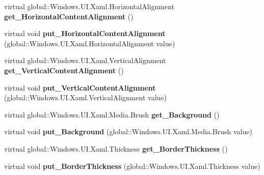 \begin{DoxyCompactItemize}
virtual global\+::\+Windows.\+U\+I.\+Xaml.\+Horizontal\+Alignment {\bfseries get\+\_\+\+Horizontal\+Content\+Alignment} ()
\item 
\mbox{\label{class_windows_1_1_u_i_1_1_xaml_1_1_controls_1_1_control_a529faaf72afad384ebe1f02f4b794a09}} 
virtual void {\bfseries put\+\_\+\+Horizontal\+Content\+Alignment} (global\+::\+Windows.\+U\+I.\+Xaml.\+Horizontal\+Alignment value)
\item 
\mbox{\label{class_windows_1_1_u_i_1_1_xaml_1_1_controls_1_1_control_a7006e185e4500ff498f82b3f44fd79fa}} 
virtual global\+::\+Windows.\+U\+I.\+Xaml.\+Vertical\+Alignment {\bfseries get\+\_\+\+Vertical\+Content\+Alignment} ()
\item 
\mbox{\label{class_windows_1_1_u_i_1_1_xaml_1_1_controls_1_1_control_af756ef0a995189ff771e3537a5391b42}} 
virtual void {\bfseries put\+\_\+\+Vertical\+Content\+Alignment} (global\+::\+Windows.\+U\+I.\+Xaml.\+Vertical\+Alignment value)
\item 
\mbox{\label{class_windows_1_1_u_i_1_1_xaml_1_1_controls_1_1_control_a5eb22428eb30c926bcbbdcce65e09678}} 
virtual global\+::\+Windows.\+U\+I.\+Xaml.\+Media.\+Brush {\bfseries get\+\_\+\+Background} ()
\item 
\mbox{\label{class_windows_1_1_u_i_1_1_xaml_1_1_controls_1_1_control_abc00b1110cfb2ca8076ac8356a548d78}} 
virtual void {\bfseries put\+\_\+\+Background} (global\+::\+Windows.\+U\+I.\+Xaml.\+Media.\+Brush value)
\item 
\mbox{\label{class_windows_1_1_u_i_1_1_xaml_1_1_controls_1_1_control_ab76eb28c6756bacca0cc41591940408d}} 
virtual global\+::\+Windows.\+U\+I.\+Xaml.\+Thickness {\bfseries get\+\_\+\+Border\+Thickness} ()
\item 
\mbox{\label{class_windows_1_1_u_i_1_1_xaml_1_1_controls_1_1_control_a4a02a62301b0458bfefc9d7c25b6511e}} 
virtual void {\bfseries put\+\_\+\+Border\+Thickness} (global\+::\+Windows.\+U\+I.\+Xaml.\+Thickness value)

\end{DoxyCompactItemize}
